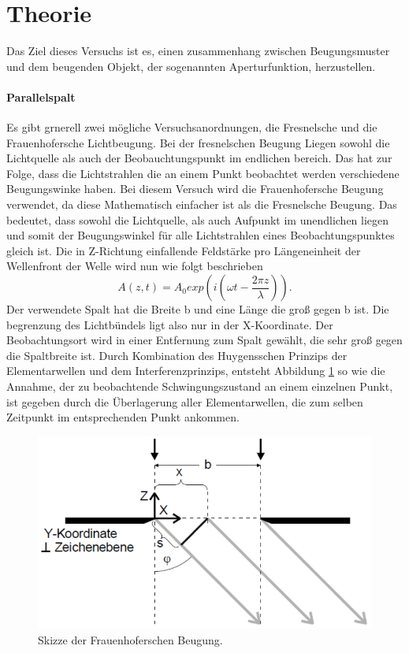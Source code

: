 \section{Theorie}
\label{sec:Theorie}
Das Ziel dieses Versuchs ist es, einen zusammenhang zwischen Beugungsmuster und dem beugenden Objekt, 
der sogenannten Aperturfunktion, herzustellen.

\paragraph{Parallelspalt}
Es gibt grnerell zwei mögliche Versuchsanordnungen, die Fresnelsche und die Frauenhofersche Lichtbeugung.
Bei der fresnelschen Beugung Liegen sowohl die Lichtquelle als auch der Beobauchtungspunkt im endlichen bereich. 
Das hat zur Folge, dass die Lichtstrahlen die an einem Punkt beobachtet werden verschiedene Beugungswinke haben.
Bei diesem Versuch wird die Frauenhofersche Beugung verwendet, da diese Mathematisch einfacher ist als die
Fresnelsche Beugung. Das bedeutet, dass sowohl die Lichtquelle, als auch Aufpunkt im unendlichen liegen und somit der 
Beugungswinkel für alle Lichtstrahlen eines Beobachtungspunktes gleich ist. 
Die in Z-Richtung einfallende Feldstärke pro Längeneinheit der Wellenfront der Welle wird nun wie folgt beschrieben
\begin{equation}
    \label{eq:1}
    A(z,t) = A_0 exp \left( i(\omega t - \frac{2 \pi z}{\lambda})\right).
\end{equation}
Der verwendete Spalt hat die Breite b und eine Länge die groß gegen b ist. Die begrenzung des Lichtbündels 
ligt also nur in der X-Koordinate. Der Beobachtungsort wird in einer Entfernung zum Spalt gewählt, die sehr groß 
gegen die Spaltbreite ist.
Durch Kombination des Huygensschen Prinzips der Elementarwellen und dem Interferenzprinzips, entsteht Abbildung \ref{fig:a} 
so wie die Annahme, der zu beobachtende Schwingungszustand an einem einzelnen Punkt, ist gegeben durch die Überlagerung 
aller Elementarwellen, die zum selben Zeitpunkt im entsprechenden Punkt ankommen.
\begin{figure}[H]
    \centering
    \includegraphics{Spalt.png}
    \caption{Skizze der Frauenhoferschen Beugung.}
    \label{fig:a}
\end{figure}
